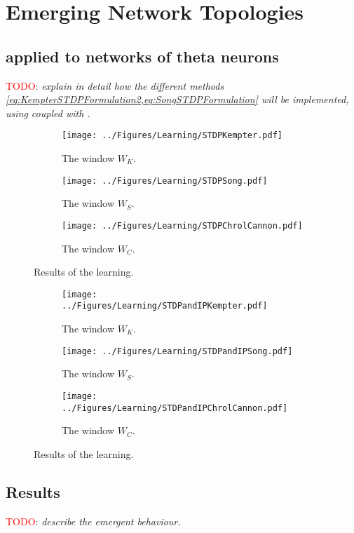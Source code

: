 \newpage
\section{\mywork Emerging Network Topologies}
\subsection{\STDP applied to networks of theta neurons}
\textcolor{red}{TODO}: \textsl{explain in detail how the different methods \cref{eq:KempterSTDPFormulation2,eq:SongSTDPFormulation} will be implemented, using \STDP coupled with \IP.}

\begin{figure}[H]
\centering
\begin{subfigure}[b]{0.32\linewidth}
   \centering
  \texttt{[image: ../Figures/Learning/STDPKempter.pdf]}
   \caption{The window $W_K$.}
   \label{fig:STDPWK} 
\end{subfigure} \hfill
\begin{subfigure}[b]{0.32\linewidth}
   \centering
  \texttt{[image: ../Figures/Learning/STDPSong.pdf]}
   \caption{The window $W_S$.}
   \label{fig:STDPWS}
\end{subfigure} \hfill
\begin{subfigure}[b]{0.32\linewidth}
   \centering
  \texttt{[image: ../Figures/Learning/STDPChrolCannon.pdf]}
   \caption{The window $W_C$.}
   \label{fig:STDPWC}
\end{subfigure}
   \caption{Results of the \STDP learning.}
   \label{fig:STDPresults}
\end{figure}

\newpage 

\begin{figure}[H]
\centering
\begin{subfigure}[b]{0.32\linewidth}
   \centering
  \texttt{[image: ../Figures/Learning/STDPandIPKempter.pdf]}
   \caption{The window $W_K$.}
   \label{fig:STDPWK} 
\end{subfigure} \hfill
\begin{subfigure}[b]{0.32\linewidth}
   \centering
  \texttt{[image: ../Figures/Learning/STDPandIPSong.pdf]}
   \caption{The window $W_S$.}
   \label{fig:STDPWS}
\end{subfigure} \hfill
\begin{subfigure}[b]{0.32\linewidth}
   \centering
  \texttt{[image: ../Figures/Learning/STDPandIPChrolCannon.pdf]}
   \caption{The window $W_C$.}
   \label{fig:STDPWC}
\end{subfigure}
   \caption{Results of the \STDP learning.}
   \label{fig:STDPresults}
\end{figure}



\subsection{Results}
\textcolor{red}{TODO}: \textsl{describe the emergent behaviour.}

